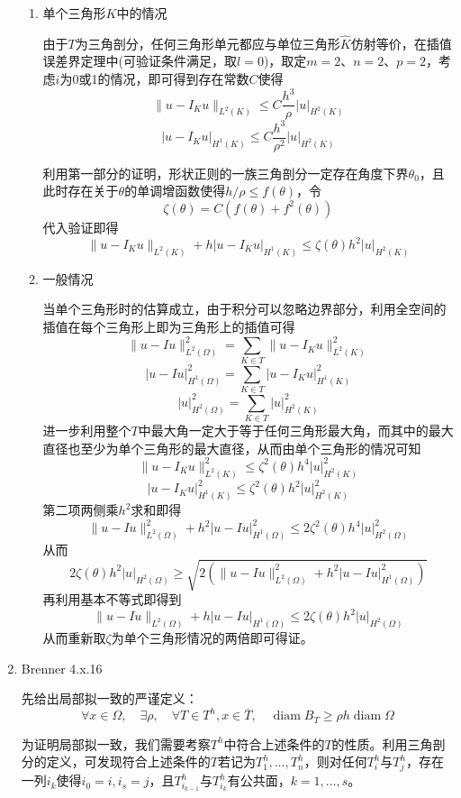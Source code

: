 \documentclass[a4paper,UTF8,fontset=windows,10pt]{ctexart}
\DeclareMathOperator*{\diam}{diam}
\begin{document}
\begin{enumerate}
\begin{enumerate}[(1)]
        \item 单个三角形$K$中的情况
        
        由于$T$为三角剖分，任何三角形单元都应与单位三角形$\hat{K}$仿射等价，在插值误差界定理中(可验证条件满足，取$l=0$)，取定$m=2$、$n=2$、$p=2$，考虑$i$为0或1的情况，即可得到存在常数$C$使得
        $$\|u-I_Ku\|_{L^2(K)}\le C\frac{h^3}{\rho}|u|_{H^2(K)}$$
        $$|u-I_Ku|_{H^1(K)}\le C\frac{h^3}{\rho^2}|u|_{H^2(K)}$$
    
        利用第一部分的证明，形状正则的一族三角剖分一定存在角度下界$\theta_0$，且此时存在关于$\theta$的单调增函数使得$h/\rho\le f(\theta)$，令
        $$\zeta(\theta)=C(f(\theta)+f^2(\theta))$$
        代入验证即得
        $$\|u-I_Ku\|_{L^2(K)}+h|u-I_Ku|_{H^1(K)}\le\zeta(\theta)h^2|u|_{H^2(K)}$$
    
        \item 一般情况
        
        当单个三角形时的估算成立，由于积分可以忽略边界部分，利用全空间的插值在每个三角形上即为三角形上的插值可得
        $$\|u-Iu\|_{L^2(\Omega)}^2=\sum_{K\in T}\|u-I_Ku\|_{L^2(K)}^2$$
        $$|u-Iu|_{H^1(\Omega)}^2=\sum_{K\in T}|u-I_Ku|_{H^1(K)}^2$$
        $$|u|_{H^2(\Omega)}^2=\sum_{K\in T}|u|_{H^2(K)}^2$$
        进一步利用整个$T$中最大角一定大于等于任何三角形最大角，而其中的最大直径也至少为单个三角形的最大直径，从而由单个三角形的情况可知
        $$\|u-I_Ku\|_{L^2(K)}^2\le\zeta^2(\theta)h^4|u|_{H^2(K)}^2$$
        $$|u-I_Ku|_{H^1(K)}^2\le\zeta^2(\theta)h^2|u|_{H^2(K)}^2$$
        第二项两侧乘$h^2$求和即得
        $$\|u-Iu\|_{L^2(\Omega)}^2+h^2|u-Iu|_{H^1(\Omega)}^2\le2\zeta^2(\theta)h^4|u|_{H^2(\Omega)}^2$$
        从而
        $$2\zeta(\theta)h^2|u|_{H^2(\Omega)}\ge\sqrt{2(\|u-Iu\|_{L^2(\Omega)}^2+h^2|u-Iu|_{H^1(\Omega)}^2)}$$
        再利用基本不等式即得到
        $$\|u-Iu\|_{L^2(\Omega)}+h|u-Iu|_{H^1(\Omega)}\le2\zeta(\theta)h^2|u|_{H^2(\Omega)}$$
        从而重新取$\zeta$为单个三角形情况的两倍即可得证。
    \end{enumerate}
    
    \item Brenner 4.x.16
    
    先给出局部拟一致的严谨定义：
    $$\forall x\in\Omega,\quad\exists\rho,\quad\forall T\in T^h,x\in\bar{T},\quad\diam B_T\ge\rho h\diam\Omega$$
    
    为证明局部拟一致，我们需要考察$T^h$中符合上述条件的$T$的性质。利用三角剖分的定义，可发现符合上述条件的$T$若记为$T_1^h,\dots,T_n^h$，则对任何$T_i^h$与$T_j^h$，存在一列$i_k$使得$i_0=i,i_s=j$，且$T_{i_{k-1}}^h$与$T_{i_k}^h$有公共面，$k=1,\dots,s$。
    

\end{enumerate}
\end{document}
